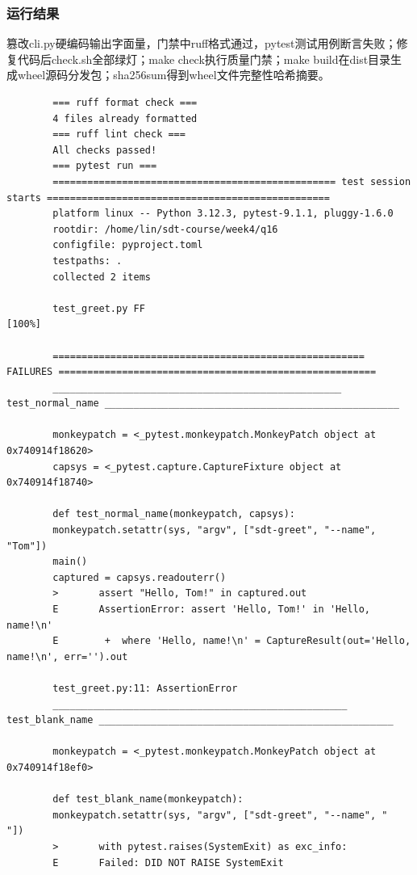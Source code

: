 \documentclass[a4paper,12pt]{ctexart}
\begin{document}
	\subsubsection{运行结果}
	篡改cli.py硬编码输出字面量，门禁中ruff格式通过，pytest测试用例断言失败；修复代码后check.sh全部绿灯；make check执行质量门禁；make build在dist目录生成wheel源码分发包；sha256sum得到wheel文件完整性哈希摘要。
	\begin{lstlisting}
		=== ruff format check ===
		4 files already formatted
		=== ruff lint check ===
		All checks passed!
		=== pytest run ===
		================================================= test session starts =================================================
		platform linux -- Python 3.12.3, pytest-9.1.1, pluggy-1.6.0
		rootdir: /home/lin/sdt-course/week4/q16
		configfile: pyproject.toml
		testpaths: .
		collected 2 items                                                                                                     
		
		test_greet.py FF                                                                                                [100%]
		
		====================================================== FAILURES =======================================================
		__________________________________________________ test_normal_name ___________________________________________________
		
		monkeypatch = <_pytest.monkeypatch.MonkeyPatch object at 0x740914f18620>
		capsys = <_pytest.capture.CaptureFixture object at 0x740914f18740>
		
		def test_normal_name(monkeypatch, capsys):
		monkeypatch.setattr(sys, "argv", ["sdt-greet", "--name", "Tom"])
		main()
		captured = capsys.readouterr()
		>       assert "Hello, Tom!" in captured.out
		E       AssertionError: assert 'Hello, Tom!' in 'Hello, name!\n'
		E        +  where 'Hello, name!\n' = CaptureResult(out='Hello, name!\n', err='').out
		
		test_greet.py:11: AssertionError
		___________________________________________________ test_blank_name ___________________________________________________
		
		monkeypatch = <_pytest.monkeypatch.MonkeyPatch object at 0x740914f18ef0>
		
		def test_blank_name(monkeypatch):
		monkeypatch.setattr(sys, "argv", ["sdt-greet", "--name", "   "])
		>       with pytest.raises(SystemExit) as exc_info:
		E       Failed: DID NOT RAISE SystemExit
		

\end{lstlisting}
\end{document}
